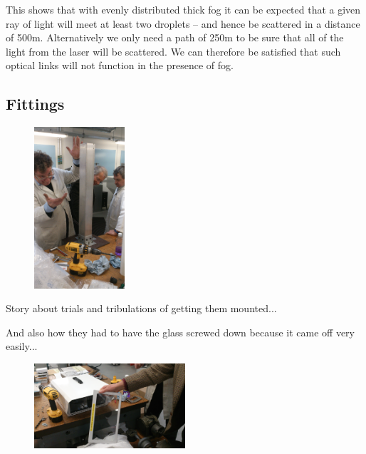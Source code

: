 This shows that with evenly distributed thick fog it can be expected
that a given ray of light will meet at least two droplets -- and hence
be scattered in a distance of 500m. Alternatively we only need a path
of 250m to be sure that all of the light from the laser will be
scattered. We can therefore be satisfied that such optical links will
not function in the presence of fog.
\clearpage
\subsection{Fittings}
\label{sec:fittings}

\begin{figure}
  \includegraphics[angle=-90,width=0.3\textwidth]{tada}
\end{figure}
Story about trials and tribulations of getting them mounted...

And also how they had to have the glass screwed down because it came
off very easily...

\begin{figure}[h]
  \begin{center}
    \includegraphics[width=0.5\textwidth]{faulty}
  \end{center}
\end{figure}

